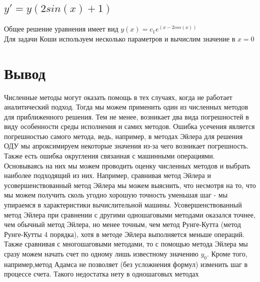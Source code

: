 \documentclass[11pt, english]{article}
\begin{document}
\subsection{$y' = y(2sin(x) + 1)$}
Общее решение уравнения имеет вид $y(x) = c_1 e^{(x - 2 cos(x))}$ \\
Для задачи Коши используем несколько параметров и вычислим значение в $x=0$
\begin{center}
\end{center}


\newpage
\section{Вывод}
Численные методы могут оказать помощь в тех случаях, когда не работает аналитический подход. Тогда мы можем применить один из численных методов для приближенного решения.
\newline\newline
Тем не менее, возникает два вида погрешностей в виду особенности среды исполнения и самих методов. Ошибка усечения является погрешностью самого метода, ведь, например, в методах Эйлера для решения ОДУ мы апроксимируем некоторые значения из-за чего возникает погрешность. Также есть ошибка округления связанная с машинными операциями.
\newline\newline
Основываясь на них мы можем проводить оценку численных методов и выбрать наиболее подходящий из них.
\newline\newline
Например, сравнивая метод Эйлера и усовершенствованный метод Эйлера мы можем выяснить, что несмотря на то, что мы можем получить сколь угодно хорошую точность уменьшая шаг - мы упираемся в характеристики вычислительной машины.
\newline\newline
Усовершенствованный метод Эйлера при сравнении с другими одношаговыми методами оказался точнее, чем обычный метод Эйлера, но менее точным, чем метод Рунге-Кутта (метод Рунге-Кутты 4 порядка), хотя в методе Эйлера выполняется меньше операций.
\newline\newline
Также сравнивая с многошаговыми методами, то с помощью метода Эйлера мы сразу можем начать счет по одному лишь известному значению $y_0$. Кроме того, например,метод Адамса не позволяет (без усложнения формул) изменить шаг в процессе счета. Такого недостатка нету в одношаговых методах
\end{document}
